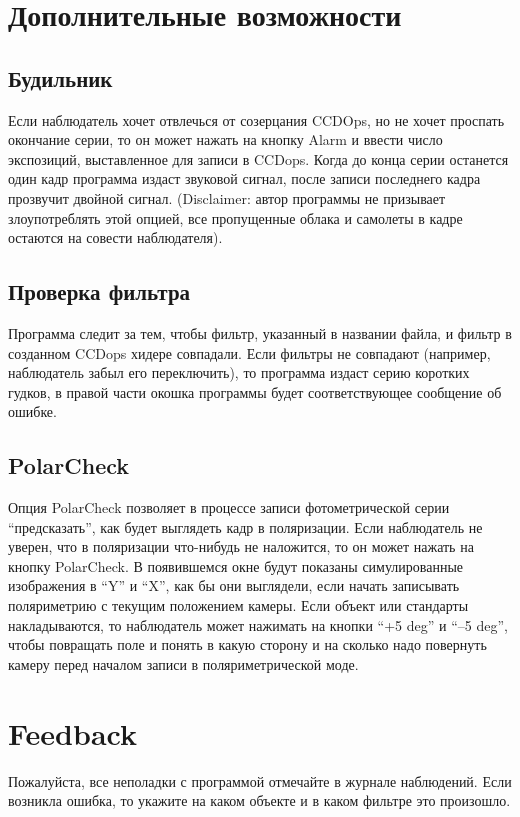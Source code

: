 \documentclass[a4paper,12pt,leqno,notitlepage]{article}
\begin{document}
\section{Дополнительные возможности}

\subsection{Будильник}
Если наблюдатель хочет отвлечься от созерцания CCDOps, но не хочет проспать окончание серии, то
он может нажать на кнопку Alarm и ввести число экспозиций, выставленное для записи в CCDops.
Когда до конца серии останется один кадр программа издаст звуковой сигнал, после записи последнего
кадра прозвучит двойной сигнал. (Disclaimer: автор программы не призывает злоупотреблять этой опцией,
все пропущенные облака и самолеты в кадре остаются на совести наблюдателя). 

\subsection{Проверка фильтра}
Программа следит за тем, чтобы фильтр, указанный в названии файла, и фильтр в созданном CCDops хидере
совпадали. Если фильтры не совпадают (например, наблюдатель забыл его переключить), то программа
издаст серию коротких гудков, в правой части окошка программы будет соответствующее сообщение об ошибке.

\subsection{PolarCheck}
Опция PolarCheck позволяет в процессе записи фотометрической серии ``предсказать'', как будет выглядеть
кадр в поляризации. Если наблюдатель не уверен, что в поляризации что-нибудь не наложится, то он может
нажать на кнопку PolarCheck. В появившемся окне будут показаны симулированные изображения в ``Y'' и ``X'',
как бы они выглядели, если начать записывать поляриметрию с текущим положением камеры. Если объект
или стандарты накладываются, то наблюдатель может нажимать на кнопки ``+5 deg'' и ``--5 deg'', чтобы
повращать поле и понять в какую сторону и на сколько надо повернуть камеру перед началом записи
в поляриметрической моде.

\section{Feedback}
Пожалуйста, все неполадки с программой отмечайте в журнале наблюдений. Если возникла ошибка, то
укажите на каком объекте и в каком фильтре это произошло.
\end{document}
